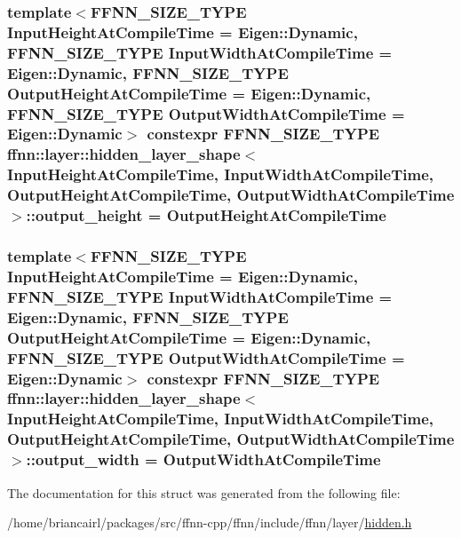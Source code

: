 \hypertarget{structffnn_1_1layer_1_1hidden__layer__shape_a5ad34d7a50c5a29c33d67e3b310a9ea0}{
\subsubsection[{output\-\_\-height}]{\setlength{\rightskip}{0pt plus 5cm}template$<$F\-F\-N\-N\-\_\-\-S\-I\-Z\-E\-\_\-\-T\-Y\-P\-E Input\-Height\-At\-Compile\-Time = Eigen\-::\-Dynamic, F\-F\-N\-N\-\_\-\-S\-I\-Z\-E\-\_\-\-T\-Y\-P\-E Input\-Width\-At\-Compile\-Time = Eigen\-::\-Dynamic, F\-F\-N\-N\-\_\-\-S\-I\-Z\-E\-\_\-\-T\-Y\-P\-E Output\-Height\-At\-Compile\-Time = Eigen\-::\-Dynamic, F\-F\-N\-N\-\_\-\-S\-I\-Z\-E\-\_\-\-T\-Y\-P\-E Output\-Width\-At\-Compile\-Time = Eigen\-::\-Dynamic$>$ constexpr {\bf F\-F\-N\-N\-\_\-\-S\-I\-Z\-E\-\_\-\-T\-Y\-P\-E} {\bf ffnn\-::layer\-::hidden\-\_\-layer\-\_\-shape}$<$ Input\-Height\-At\-Compile\-Time, Input\-Width\-At\-Compile\-Time, Output\-Height\-At\-Compile\-Time, Output\-Width\-At\-Compile\-Time $>$\-::output\-\_\-height = Output\-Height\-At\-Compile\-Time\hspace{0.3cm}{\ttfamily [static]}}}\label{structffnn_1_1layer_1_1hidden__layer__shape_a5ad34d7a50c5a29c33d67e3b310a9ea0}
\hypertarget{structffnn_1_1layer_1_1hidden__layer__shape_a7ed9a65ec3fe465360015faa70306067}{
\subsubsection[{output\-\_\-width}]{\setlength{\rightskip}{0pt plus 5cm}template$<$F\-F\-N\-N\-\_\-\-S\-I\-Z\-E\-\_\-\-T\-Y\-P\-E Input\-Height\-At\-Compile\-Time = Eigen\-::\-Dynamic, F\-F\-N\-N\-\_\-\-S\-I\-Z\-E\-\_\-\-T\-Y\-P\-E Input\-Width\-At\-Compile\-Time = Eigen\-::\-Dynamic, F\-F\-N\-N\-\_\-\-S\-I\-Z\-E\-\_\-\-T\-Y\-P\-E Output\-Height\-At\-Compile\-Time = Eigen\-::\-Dynamic, F\-F\-N\-N\-\_\-\-S\-I\-Z\-E\-\_\-\-T\-Y\-P\-E Output\-Width\-At\-Compile\-Time = Eigen\-::\-Dynamic$>$ constexpr {\bf F\-F\-N\-N\-\_\-\-S\-I\-Z\-E\-\_\-\-T\-Y\-P\-E} {\bf ffnn\-::layer\-::hidden\-\_\-layer\-\_\-shape}$<$ Input\-Height\-At\-Compile\-Time, Input\-Width\-At\-Compile\-Time, Output\-Height\-At\-Compile\-Time, Output\-Width\-At\-Compile\-Time $>$\-::output\-\_\-width = Output\-Width\-At\-Compile\-Time\hspace{0.3cm}{\ttfamily [static]}}}\label{structffnn_1_1layer_1_1hidden__layer__shape_a7ed9a65ec3fe465360015faa70306067}


The documentation for this struct was generated from the following file\-:\begin{DoxyCompactItemize}
\item 
/home/briancairl/packages/src/ffnn-\/cpp/ffnn/include/ffnn/layer/\hyperlink{hidden_8h}{hidden.\-h}\end{DoxyCompactItemize}
